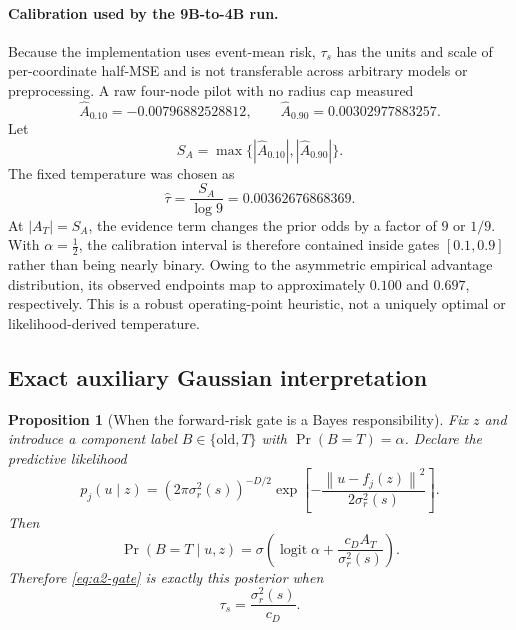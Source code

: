 \documentclass[11pt,a4paper]{article}
\newcommand{\norm}[1]{\left\lVert #1 \right\rVert}
\DeclareMathOperator{\logit}{logit}
\theoremstyle{plain}
\newtheorem{proposition}[theorem]{Proposition}
\theoremstyle{definition}
\begin{document}
\paragraph{Calibration used by the 9B-to-4B run.}
Because the implementation uses event-mean risk, $\tau_s$ has the units and scale of per-coordinate
half-MSE and is not transferable across arbitrary models or preprocessing.  A raw four-node pilot
with no radius cap measured
\[
\widehat A_{0.10}=-0.00796882528812,
\qquad
\widehat A_{0.90}=0.00302977883257.
\]
Let
\[
S_A=\max\{|\widehat A_{0.10}|,|\widehat A_{0.90}|\}.
\]
The fixed temperature was chosen as
\begin{equation}
\widehat\tau
=
\frac{S_A}{\log 9}
=0.00362676868369.
\label{eq:a2-temperature-calibration}
\end{equation}
At $|A_T|=S_A$, the evidence term changes the prior odds by a factor of $9$ or $1/9$.
With $\alpha=\tfrac12$, the calibration interval is therefore contained inside gates
$[0.1,0.9]$ rather than being nearly binary.  Owing to the asymmetric empirical advantage
distribution, its observed endpoints map to approximately $0.100$ and $0.697$, respectively.
This is a robust operating-point heuristic, not a uniquely optimal or likelihood-derived
temperature.

\subsection{Exact auxiliary Gaussian interpretation}

\begin{proposition}[When the forward-risk gate is a Bayes responsibility]
\label{prop:a2-gaussian}
Fix $z$ and introduce a component label $B\in\{\mathrm{old},T\}$ with
$\Pr(B=T)=\alpha$.  Declare the predictive likelihood
\begin{equation}
p_j(u\mid z)
=
(2\pi\sigma_r^2(s))^{-D/2}
\exp\!\left[
  -\frac{\norm{u-f_j(z)}^2}{2\sigma_r^2(s)}
\right].
\label{eq:a2-predictive-model}
\end{equation}
Then
\begin{equation}
\Pr(B=T\mid u,z)
=
\sigma\!\left(
  \logit\alpha
  +\frac{c_D A_T}{\sigma_r^2(s)}
\right).
\label{eq:a2-posterior}
\end{equation}
Therefore \eqref{eq:a2-gate} is exactly this posterior when
\begin{equation}
\tau_s=\frac{\sigma_r^2(s)}{c_D}.
\label{eq:a2-exact-temperature}
\end{equation}
\end{proposition}
\end{document}
